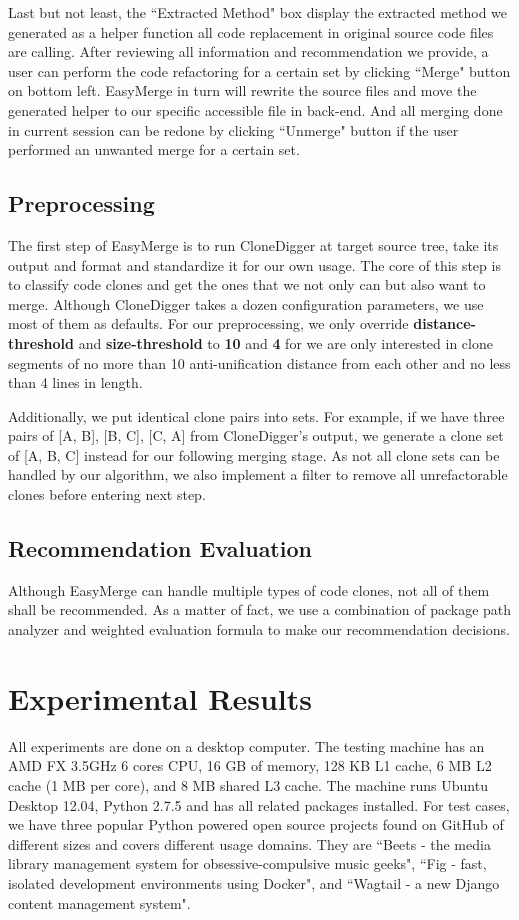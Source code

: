 \documentclass{acm_proc_article-sp}
\begin{document}
Last but not least, the ``Extracted Method" box display the extracted method we generated as a helper function all code replacement 
in original source code files are calling. After reviewing all information and recommendation we provide, a user can perform the code refactoring for
a certain set by clicking ``Merge" button on bottom left. 
EasyMerge in turn will rewrite the source files and move the generated helper to our specific accessible file in back-end.
And all merging done in current session can be redone by clicking ``Unmerge" button if
the user performed an unwanted merge for a certain set.

\subsection{Preprocessing}
The first step of EasyMerge is to run CloneDigger at target source tree, take its output and format and standardize it for our own usage.
The core of this step is to classify code clones and get the ones that we not only can but also want to merge. Although CloneDigger takes
a dozen configuration parameters, we use most of them as defaults. For our preprocessing, we only override {\bf distance-threshold} and {\bf size-threshold}
to {\bf 10} and {\bf 4} for we are only interested in clone segments of no more than 10 anti-unification distance from each other and no less than 4 lines in length.

Additionally, we put identical clone pairs into sets. For example, if we have three pairs of [A, B], [B, C], [C, A] from CloneDigger's output, we generate a clone set
of [A, B, C] instead for our following merging stage. As not all clone sets can be handled by our algorithm, we also implement a filter to remove all unrefactorable
clones before entering next step.

\subsection{Recommendation Evaluation}
Although EasyMerge can handle multiple types of code clones, not all of them shall be recommended. As a matter of fact, we use a combination of 
package path analyzer and weighted evaluation formula to make our recommendation decisions.


\section{Experimental Results}
All experiments are done on a desktop computer. The testing machine has an AMD FX 3.5GHz 6 cores CPU, 16 GB of memory,
128 KB L1 cache, 6 MB L2 cache (1 MB per core), and 8 MB shared L3 cache. The machine runs Ubuntu Desktop 12.04, Python
2.7.5 and has all related packages installed. For test cases, we have three popular Python powered open source projects found on GitHub of different sizes and covers
different usage domains.
They are ``Beets - the media library management system for obsessive-compulsive music geeks", ``Fig - fast, isolated development environments using Docker",
and ``Wagtail - a new Django content management system".
\end{document}
